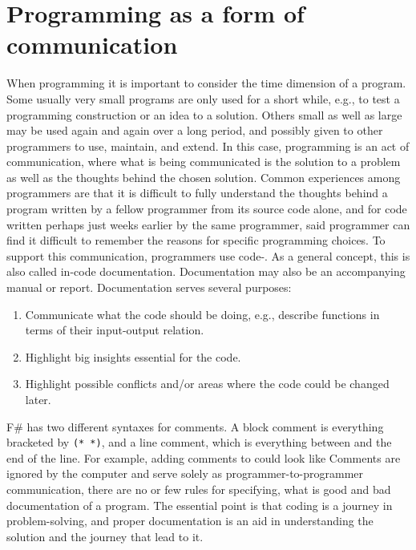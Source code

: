 \documentclass[fsharpNotes.tex]{subfiles}
\begin{document}
\section{Programming as a form of communication}
When programming it is important to consider the time dimension of a program. Some usually very small programs are only used for a short while, e.g., to test a programming construction or an idea to a solution. Others small as well as large may be used again and again over a long period, and possibly given to other programmers to use, maintain, and extend. In this case, programming is an act of communication, where what is being communicated is the solution to a problem as well as the thoughts behind the chosen solution. Common experiences among programmers are that it is difficult to fully understand the thoughts behind a program written by a fellow programmer from its source code alone, and for code written perhaps just weeks earlier by the same programmer, said programmer can find it difficult to remember the reasons for specific programming choices. To support this communication, programmers use code-. As a general concept, this is also called in-code documentation. Documentation may also be an accompanying manual or report. Documentation serves several purposes:
\begin{enumerate}
\item Communicate what the code should be doing, e.g., describe functions in terms of their input-output relation.
\item Highlight big insights essential for the code.
\item Highlight possible conflicts and/or areas where the code could be changed later.
\end{enumerate}
F\# has two different syntaxes for comments. A block comment is everything bracketed by \lstinline{(* *)}, and a line comment, which is everything between \lexeme{//} and the end of the line. For example, adding comments to  could look like 
% 
%
Comments are ignored by the computer and serve solely as programmer-to-programmer communication, there are no or few rules for specifying, what is good and bad documentation of a program. The essential point is that coding is a journey in problem-solving, and proper documentation is an aid in understanding the solution and the journey that lead to it.
\end{document}
